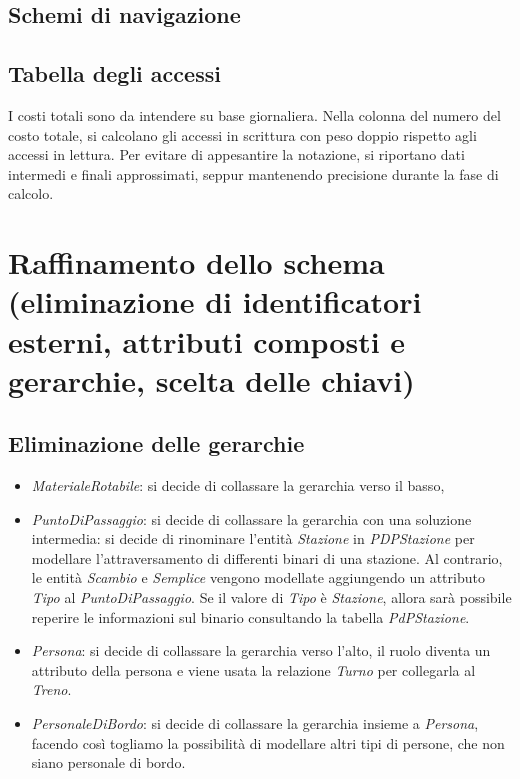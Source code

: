 \documentclass[a4paper,12pt]{report}
\begin{document}
	\subsection{Schemi di navigazione}
	\subsection{Tabella degli accessi}
	\par I costi totali sono da intendere su base giornaliera. Nella colonna del numero del costo totale, si
	calcolano gli accessi in scrittura con peso doppio rispetto agli accessi in lettura. Per evitare di
	appesantire la notazione, si riportano dati intermedi e finali approssimati, seppur mantenendo
	precisione durante la fase di calcolo.
	
	\section{Raffinamento dello schema (eliminazione di identificatori esterni, attributi composti e gerarchie, scelta delle chiavi)}
	\subsection{Eliminazione delle gerarchie}
	\begin{itemize}
		\item \textit{MaterialeRotabile}: si decide di collassare la gerarchia verso il basso,
		\item \textit{PuntoDiPassaggio}: si decide di collassare la gerarchia con una soluzione intermedia:
			si decide di rinominare l'entit\`a \textit{Stazione} in \textit{PDPStazione} per modellare l'attraversamento di differenti binari di una stazione.
			Al contrario, le entit\`a \textit{Scambio} e \textit{Semplice} vengono modellate aggiungendo un attributo \textit{Tipo} al \textit{PuntoDiPassaggio}. Se il valore di \textit{Tipo} \`e \textit{Stazione}, allora sar\`a possibile reperire le informazioni sul binario consultando la tabella \textit{PdPStazione}.
		\item \textit{Persona}: si decide di collassare la gerarchia verso l'alto, il ruolo diventa un attributo della persona e viene usata la relazione \textit{Turno} per collegarla al \textit{Treno}.
		\item \textit{PersonaleDiBordo}: si decide di collassare la gerarchia insieme a \textit{Persona}, facendo cos\`i togliamo la possibilit\`a di modellare altri tipi di persone, che non siano personale di bordo.
	\end{itemize}
\end{document}

